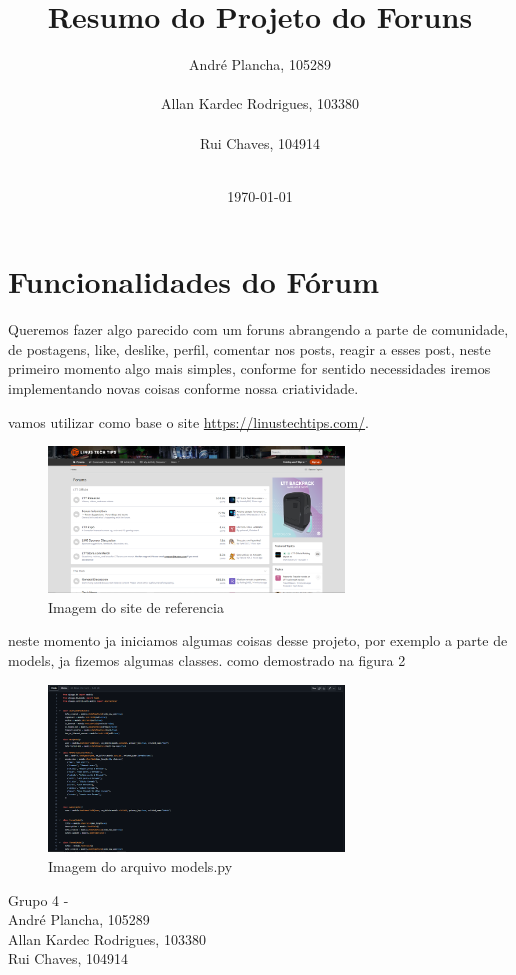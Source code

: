 \documentclass{article}
\title{Resumo do Projeto do Foruns}
\author{
  André Plancha, 105289 \\
  \email{Andre\_Plancha@iscte-iul.pt}\\
  Allan Kardec Rodrigues, 103380 \\
  \email{aksrs@iscte-iul.pt} \\
  Rui Chaves, 104914 \\
  \email{rfpcs1@iscte.pt}\\
  \vspace{30pt}
}
\date{\today}
\begin{document}
  \thispagestyle{empty}
  \section{Funcionalidades do Fórum}
  
  Queremos fazer algo parecido com um foruns abrangendo a parte de comunidade, de postagens, like, deslike, perfil, comentar nos posts, reagir a esses post, neste primeiro momento algo mais simples, conforme for sentido necessidades iremos implementando novas coisas conforme nossa criatividade.

  vamos utilizar como base o site \url{https://linustechtips.com/}.

  \begin{figure}[h]
    \centering
    \includegraphics[width=0.7\textwidth]{image.png}
    \caption{Imagem do site de referencia}
    \label{fig:imagem}
  \end{figure}

  neste momento ja iniciamos algumas coisas desse projeto, por exemplo a parte de models, ja fizemos algumas classes. como demostrado na figura 2

  \begin{figure}[h]
    \centering
    \includegraphics[width=0.7\textwidth]{image1.png}
    \caption{Imagem do arquivo models.py}
    \label{fig:imagem}
  \end{figure}

  Grupo 4 - \\
  André Plancha, 105289 \\
  Allan Kardec Rodrigues, 103380 \\
  Rui Chaves, 104914
\end{document}
